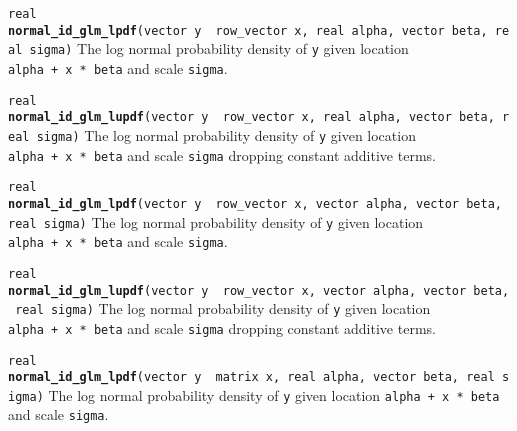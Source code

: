 \documentclass[
  10pt,
]{book}
\begin{document}

\texttt{real} \textbf{\texttt{normal\_id\_glm\_lpdf}}\texttt{(vector\ y\ \textbar{}\ row\_vector\ x,\ real\ alpha,\ vector\ beta,\ real\ sigma)}\newline
The log normal probability density of \texttt{y} given location \texttt{alpha\ +\ x\ *\ beta}
and scale \texttt{sigma}.


\texttt{real} \textbf{\texttt{normal\_id\_glm\_lupdf}}\texttt{(vector\ y\ \textbar{}\ row\_vector\ x,\ real\ alpha,\ vector\ beta,\ real\ sigma)}\newline
The log normal probability density of \texttt{y} given location \texttt{alpha\ +\ x\ *\ beta}
and scale \texttt{sigma} dropping constant additive terms.


\texttt{real} \textbf{\texttt{normal\_id\_glm\_lpdf}}\texttt{(vector\ y\ \textbar{}\ row\_vector\ x,\ vector\ alpha,\ vector\ beta,\ real\ sigma)}\newline
The log normal probability density of \texttt{y} given location \texttt{alpha\ +\ x\ *\ beta}
and scale \texttt{sigma}.


\texttt{real} \textbf{\texttt{normal\_id\_glm\_lupdf}}\texttt{(vector\ y\ \textbar{}\ row\_vector\ x,\ vector\ alpha,\ vector\ beta,\ real\ sigma)}\newline
The log normal probability density of \texttt{y} given location \texttt{alpha\ +\ x\ *\ beta}
and scale \texttt{sigma} dropping constant additive terms.


\texttt{real} \textbf{\texttt{normal\_id\_glm\_lpdf}}\texttt{(vector\ y\ \textbar{}\ matrix\ x,\ real\ alpha,\ vector\ beta,\ real\ sigma)}\newline
The log normal probability density of \texttt{y} given location \texttt{alpha\ +\ x\ *\ beta}
and scale \texttt{sigma}.
\end{document}
